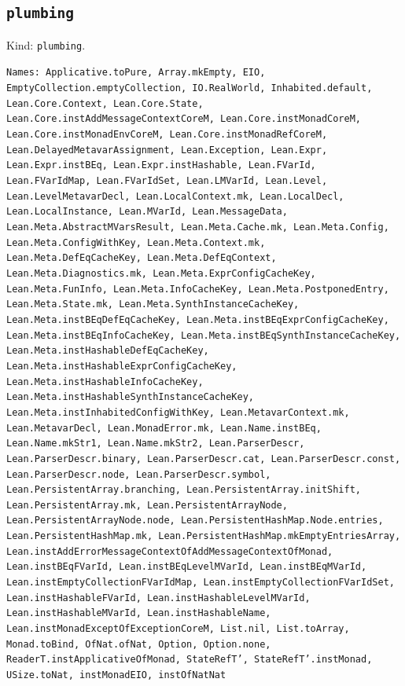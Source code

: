 \documentclass[11pt]{article}
\begin{document}
\subsection*{\texttt{plumbing}}
\noindent Kind: \texttt{plumbing}.\par
\noindent \texttt{Names: Applicative.toPure, Array.mkEmpty, EIO, EmptyCollection.emptyCollection, IO.RealWorld, Inhabited.default, Lean.Core.Context, Lean.Core.State, Lean.Core.instAddMessageContextCoreM, Lean.Core.instMonadCoreM, Lean.Core.instMonadEnvCoreM, Lean.Core.instMonadRefCoreM, Lean.DelayedMetavarAssignment, Lean.Exception, Lean.Expr, Lean.Expr.instBEq, Lean.Expr.instHashable, Lean.FVarId, Lean.FVarIdMap, Lean.FVarIdSet, Lean.LMVarId, Lean.Level, Lean.LevelMetavarDecl, Lean.LocalContext.mk, Lean.LocalDecl, Lean.LocalInstance, Lean.MVarId, Lean.MessageData, Lean.Meta.AbstractMVarsResult, Lean.Meta.Cache.mk, Lean.Meta.Config, Lean.Meta.ConfigWithKey, Lean.Meta.Context.mk, Lean.Meta.DefEqCacheKey, Lean.Meta.DefEqContext, Lean.Meta.Diagnostics.mk, Lean.Meta.ExprConfigCacheKey, Lean.Meta.FunInfo, Lean.Meta.InfoCacheKey, Lean.Meta.PostponedEntry, Lean.Meta.State.mk, Lean.Meta.SynthInstanceCacheKey, Lean.Meta.instBEqDefEqCacheKey, Lean.Meta.instBEqExprConfigCacheKey, Lean.Meta.instBEqInfoCacheKey, Lean.Meta.instBEqSynthInstanceCacheKey, Lean.Meta.instHashableDefEqCacheKey, Lean.Meta.instHashableExprConfigCacheKey, Lean.Meta.instHashableInfoCacheKey, Lean.Meta.instHashableSynthInstanceCacheKey, Lean.Meta.instInhabitedConfigWithKey, Lean.MetavarContext.mk, Lean.MetavarDecl, Lean.MonadError.mk, Lean.Name.instBEq, Lean.Name.mkStr1, Lean.Name.mkStr2, Lean.ParserDescr, Lean.ParserDescr.binary, Lean.ParserDescr.cat, Lean.ParserDescr.const, Lean.ParserDescr.node, Lean.ParserDescr.symbol, Lean.PersistentArray.branching, Lean.PersistentArray.initShift, Lean.PersistentArray.mk, Lean.PersistentArrayNode, Lean.PersistentArrayNode.node, Lean.PersistentHashMap.Node.entries, Lean.PersistentHashMap.mk, Lean.PersistentHashMap.mkEmptyEntriesArray, Lean.instAddErrorMessageContextOfAddMessageContextOfMonad, Lean.instBEqFVarId, Lean.instBEqLevelMVarId, Lean.instBEqMVarId, Lean.instEmptyCollectionFVarIdMap, Lean.instEmptyCollectionFVarIdSet, Lean.instHashableFVarId, Lean.instHashableLevelMVarId, Lean.instHashableMVarId, Lean.instHashableName, Lean.instMonadExceptOfExceptionCoreM, List.nil, List.toArray, Monad.toBind, OfNat.ofNat, Option, Option.none, ReaderT.instApplicativeOfMonad, StateRefT', StateRefT'.instMonad, USize.toNat, instMonadEIO, instOfNatNat}\par
\end{document}
